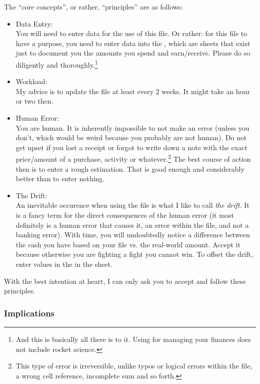 The ``core concepts'', or rather, ``principles'' are as follows:
\begin{itemize}
	\item Data Entry:\\
	You will need to enter data for the use of this file.
	Or rather: for this file to have a purpose, you need to enter data into the , which are sheets that exist just to document you the amounts you spend and earn/receive.
	Please do so diligently and thoroughly.\footnote{And this is basically all there is to it.
	Using \tfn for managing your finances does not include rocket science.}
	\item Workload:\\
	My advice is to update the file at least every 2 weeks.
	It might take an hour or two then.
	\item Human Error:\\
	You are human.
	It is inherently impossible to not make an error (unless you don't, which would be weird because you probably are not human).
	Do not get upset if you lost a receipt or forgot to write down a note with the exact price/amount of a purchase, activity or whatever.\footnote{This type of error is irreversible, unlike typos or logical errors within the file, \eg a wrong cell reference, incomplete sum and so forth.}
	The best course of action then is to enter a rough estimation.
	That is good enough and considerably better than to enter nothing.
	\item The Drift:\\
	An inevitable occurence when using the file is what I like to call \emph{the drift}.
	It is a fancy term for the direct consequences of the human error (it most definitely is a human error that causes it, \ie an error within the file, and not a banking error).
	With time, you will undoubtedly notice a difference between the cash you have based on your file vs. the real-world amount.
	Accept it because otherwise you are fighting a fight you cannot win.
	To offset the drift, enter values in the  in the  sheet.
\end{itemize}
With the best intention at heart, I can only ask you to accept and follow these principles.

\subsubsection{Implications}
\label{subsubsec:implications}

